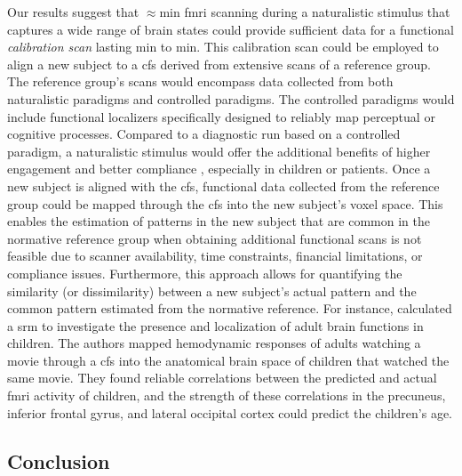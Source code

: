 %
Our results suggest that $\approx$\unit[15]{min} \ac{fmri} scanning during a
naturalistic stimulus that captures a wide range of brain states could provide
sufficient data for a functional \textit{calibration scan} lasting
\unit[15]{min} to \unit[30]{min}.
%
This calibration scan could be employed to align a new subject to a \ac{cfs}
derived from extensive scans of a reference group.
%
The reference group's scans would encompass data collected from both
naturalistic paradigms and controlled paradigms.
%
The controlled paradigms would include functional localizers specifically
designed to reliably map perceptual or cognitive processes.
%
Compared to a diagnostic run based on a controlled paradigm, a naturalistic
stimulus would offer the additional benefits of higher engagement and better
compliance \citep{vanderwal2015inscapes, eickhoff2020towards}, especially in
children or patients.
%
Once a new subject is aligned with the \ac{cfs}, functional data collected from
the reference group could be mapped through the \ac{cfs} into the new subject's
voxel space.
%
This enables the estimation of patterns in the new subject that are common in
the normative reference group when obtaining additional functional scans is not
feasible due to scanner availability, time constraints, financial limitations,
or compliance issues.
%
Furthermore, this approach allows for quantifying the similarity (or
dissimilarity) between a new subject's actual pattern and the common pattern
estimated from the normative reference.
%
For instance, \citet{yates2021emergence} calculated a \ac{srm} to investigate
the presence and localization of adult brain functions in children.
%
The authors mapped hemodynamic responses of adults watching a movie through a
\ac{cfs} into the anatomical brain space of children that watched the same
movie.
%
They found reliable correlations between the predicted and actual \ac{fmri}
activity of children, and the strength of these correlations in the precuneus,
inferior frontal gyrus, and lateral occipital cortex could predict the
children's age.



\subsection{Conclusion}



\footnotesize

